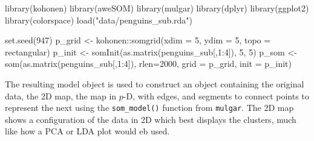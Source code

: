 \documentclass[
  letterpaper,
]{krantz}
\newenvironment{Shaded}{\begin{snugshade}}{\end{snugshade}}
\newcommand{\AttributeTok}[1]{\textcolor[rgb]{0.40,0.45,0.13}{#1}}
\newcommand{\DecValTok}[1]{\textcolor[rgb]{0.68,0.00,0.00}{#1}}
\newcommand{\FunctionTok}[1]{\textcolor[rgb]{0.28,0.35,0.67}{#1}}
\newcommand{\NormalTok}[1]{\textcolor[rgb]{0.00,0.23,0.31}{#1}}
\newcommand{\OtherTok}[1]{\textcolor[rgb]{0.00,0.23,0.31}{#1}}
\newcommand{\SpecialCharTok}[1]{\textcolor[rgb]{0.37,0.37,0.37}{#1}}
\newcommand{\StringTok}[1]{\textcolor[rgb]{0.13,0.47,0.30}{#1}}
\begin{document}
\begin{Shaded}
\begin{Highlighting}[]
\FunctionTok{library}\NormalTok{(kohonen)}
\FunctionTok{library}\NormalTok{(aweSOM)}
\FunctionTok{library}\NormalTok{(mulgar)}
\FunctionTok{library}\NormalTok{(dplyr)}
\FunctionTok{library}\NormalTok{(ggplot2)}
\FunctionTok{library}\NormalTok{(colorspace)}
\FunctionTok{load}\NormalTok{(}\StringTok{"data/penguins\_sub.rda"}\NormalTok{)}

\FunctionTok{set.seed}\NormalTok{(}\DecValTok{947}\NormalTok{)}
\NormalTok{p\_grid }\OtherTok{\textless{}{-}}\NormalTok{ kohonen}\SpecialCharTok{::}\FunctionTok{somgrid}\NormalTok{(}\AttributeTok{xdim =} \DecValTok{5}\NormalTok{, }\AttributeTok{ydim =} \DecValTok{5}\NormalTok{,}
                           \AttributeTok{topo =} \StringTok{\textquotesingle{}rectangular\textquotesingle{}}\NormalTok{)}
\NormalTok{p\_init }\OtherTok{\textless{}{-}} \FunctionTok{somInit}\NormalTok{(}\FunctionTok{as.matrix}\NormalTok{(penguins\_sub[,}\DecValTok{1}\SpecialCharTok{:}\DecValTok{4}\NormalTok{]), }\DecValTok{5}\NormalTok{, }\DecValTok{5}\NormalTok{)}
\NormalTok{p\_som }\OtherTok{\textless{}{-}} \FunctionTok{som}\NormalTok{(}\FunctionTok{as.matrix}\NormalTok{(penguins\_sub[,}\DecValTok{1}\SpecialCharTok{:}\DecValTok{4}\NormalTok{]), }
             \AttributeTok{rlen=}\DecValTok{2000}\NormalTok{,}
             \AttributeTok{grid =}\NormalTok{ p\_grid,}
             \AttributeTok{init =}\NormalTok{ p\_init)}
\end{Highlighting}
\end{Shaded}

The resulting model object is used to construct an object containing the
original data, the 2D map, the map in \(p\)-D, with edges, and segments
to connect points to represent the next using the \texttt{som\_model()}
function from \texttt{mulgar}. The 2D map shows a configuration of the
data in 2D which best displays the clusters, much like how a PCA or LDA
plot would eb used.
\end{document}
